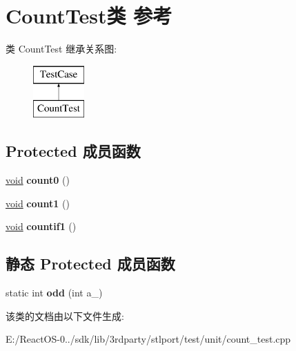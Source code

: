 \hypertarget{class_count_test}{}\section{Count\+Test类 参考}
\label{class_count_test}
类 Count\+Test 继承关系图\+:\begin{figure}[H]
\begin{center}
\leavevmode
\includegraphics[height=2.000000cm]{class_count_test}
\end{center}
\end{figure}
\subsection*{Protected 成员函数}
\begin{DoxyCompactItemize}
\item 
\mbox{\label{class_count_test_a733375794dbd0a535faca5d998c31ca5}} 
\hyperlink{interfacevoid}{void} {\bfseries count0} ()
\item 
\mbox{\label{class_count_test_af78107692be591ac92ba046e8e94cb69}} 
\hyperlink{interfacevoid}{void} {\bfseries count1} ()
\item 
\mbox{\label{class_count_test_ab81deddbf9a05f3d1f031bd49477aace}} 
\hyperlink{interfacevoid}{void} {\bfseries countif1} ()
\end{DoxyCompactItemize}
\subsection*{静态 Protected 成员函数}
\begin{DoxyCompactItemize}
\item 
\mbox{\label{class_count_test_a19d4d40d438deac9b8656a448c37bf1b}} 
static int {\bfseries odd} (int a\+\_\+)
\end{DoxyCompactItemize}


该类的文档由以下文件生成\+:\begin{DoxyCompactItemize}
\item 
E\+:/\+React\+O\+S-\/0../sdk/lib/3rdparty/stlport/test/unit/count\+\_\+test.\+cpp\end{DoxyCompactItemize}
